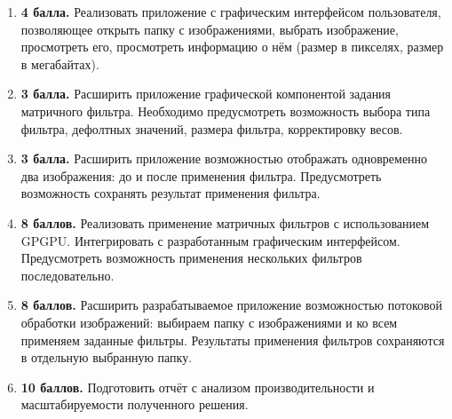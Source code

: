 \begin{enumerate}
    \item \textbf{4 балла.} Реализовать приложение с графическим интерфейсом пользователя, позволяющее открыть папку с изображениями, выбрать изображение, просмотреть его, просмотреть информацию о нём (размер в пикселях, размер в мегабайтах).

    \item \textbf{3 балла.} Расширить приложение графической компонентой задания матричного фильтра. Необходимо предусмотреть возможность выбора типа фильтра, дефолтных значений, размера фильтра, корректировку весов.

    \item \textbf{3 балла.} Расширить приложение возможностью отображать одновременно два изображения: до и после применения фильтра. Предусмотреть возможность сохранять результат применения фильтра.

    \item \textbf{8 баллов.} Реализовать применение матричных фильтров с использованием GPGPU. Интегрировать с разработанным графическим интерфейсом. Предусмотреть возможность применения нескольких фильтров последовательно.

    \item \textbf{8 баллов.} Расширить разрабатываемое приложение возможностью потоковой обработки изображений: выбираем папку с изображениями и ко всем применяем заданные фильтры. Результаты применения фильтров сохраняются в отдельную выбранную папку.

    \item \textbf{10 баллов.} Подготовить отчёт с анализом производительности и масштабируемости полученного решения.
\end{enumerate}